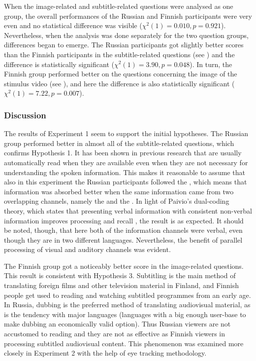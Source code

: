 \documentclass[output=paper]{langsci/langscibook}
\begin{document}
When the image-related and subtitle-related questions were analysed as one group, the overall performances of the Russian and Finnish participants were very even and no statistical difference was visible (${\chi}^2(1) = 0.010, p = 0.921$). Nevertheless, when the analysis was done separately for the two question groups, differences began to emerge. The Russian participants got slightly better scores than the Finnish participants in the subtitle-related questions (see ) and the difference is statistically significant (${\chi}^2(1) = 3.90, p = 0.048$).  In turn, the Finnish group performed better on the questions concerning the image of the stimulus video (see ), and here the difference is also statistically significant (${\chi}^2(1) = 7.22, p = 0.007$).

\subsubsection{Discussion}
\largerpage
The results of Experiment 1 seem to support the initial hypotheses. The Russian group performed better in almost all of the subtitle-related questions, which confirms Hypothesis 1. It has been shown in previous research \citep{dydewalle1987} that  are usually automatically read when they are available even when they are not necessary for understanding the spoken information. This makes it reasonable to assume that also in this experiment the Russian participants followed the , which means that information was absorbed better when the same information came from two overlapping channels, namely the  and the . In light of Paivio's dual-coding theory, which states that presenting verbal information with consistent non-verbal information improves processing and recall \citep{Paivio1986}, the result is as expected. It should be noted, though, that here both of the information channels were verbal, even though they are in two different languages. Nevertheless, the benefit of parallel processing of visual and auditory channels was evident. 

The Finnish group got a noticeably better score in the image-related questions. This result is consistent with Hypothesis 3. Subtitling is the main method of translating foreign films and other television material in Finland, and Finnish people get used to reading  and watching subtitled programmes from an early age. In Russia, dubbing is the preferred method of translating audiovisual material, as is the tendency with major languages (languages with a big enough user-base to make dubbing an economically valid option). Thus Russian viewers are not accustomed to reading  and they are not as effective as Finnish viewers in processing subtitled audiovisual content. This phenomenon was examined more closely in Experiment 2 with the help of eye tracking methodology.
\end{document}
